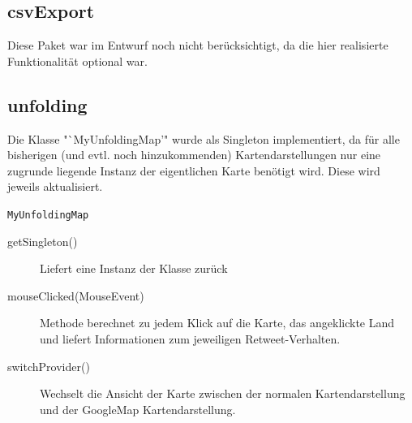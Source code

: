 \subsection{csvExport}
Diese Paket war im Entwurf noch nicht berücksichtigt, da die hier realisierte Funktionalität optional war.
\subsection{unfolding} 
Die Klasse "`MyUnfoldingMap'" wurde als Singleton implementiert, da für alle bisherigen (und evtl. noch hinzukommenden) Kartendarstellungen nur eine zugrunde liegende Instanz der eigentlichen Karte benötigt wird. Diese wird jeweils aktualisiert.
\begin{description}
	\item \lstinline{MyUnfoldingMap}
	\begin{description}
			\item[getSingleton()] Liefert eine Instanz der Klasse zurück
			\item[mouseClicked(MouseEvent)] Methode berechnet zu jedem Klick auf die Karte, das angeklickte Land und liefert Informationen zum jeweiligen Retweet-Verhalten.
			\item[switchProvider()] Wechselt die Ansicht der Karte zwischen der normalen Kartendarstellung und der GoogleMap Kartendarstellung.
	\end{description}
\end{description}
	
